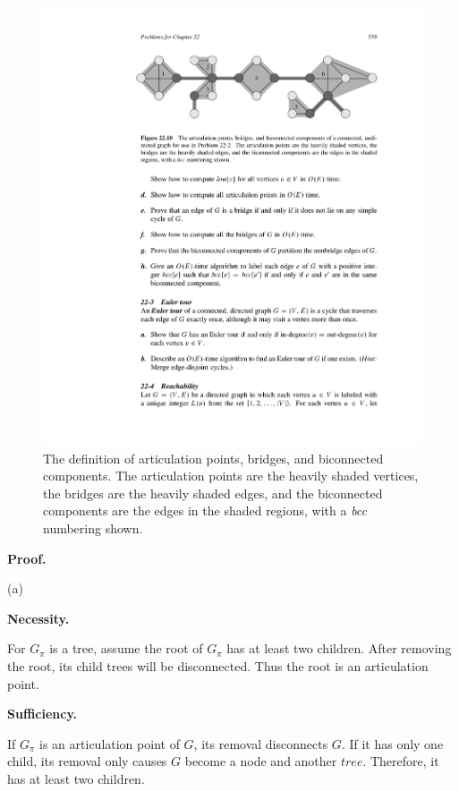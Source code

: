 \documentclass[12pt,a4paper]{article}
\theoremstyle{definition}
\begin{document}
\begin{enumerate}
	 \begin{figure}[htbp]
	 	
		\centering
		\includegraphics[width=6in]{Fig-Definition.pdf}
		\caption{The definition of articulation points, bridges, and biconnected components. The articulation points are the heavily shaded vertices, the bridges are the heavily shaded edges, and the biconnected components are the edges in the shaded regions, with a \textit{bcc} numbering shown.}
		\label{def}
	\end{figure}

	\textbf{Proof.}
	
	(a)

	\textbf{Necessity.}
	
	For $G_{\pi}$ is a tree, assume the root of $G_{\pi}$ has at least two children.
	After removing the root, its child trees will be disconnected. Thus the root is an articulation point.


	\textbf{Sufficiency.}

	If $G_{\pi}$ is an articulation point of $G$, its removal disconnects $G$. If it has only one child, its removal only causes $G$ become a node and another $tree$.
	Therefore, it has at least two children.


\end{enumerate}
\end{document}
